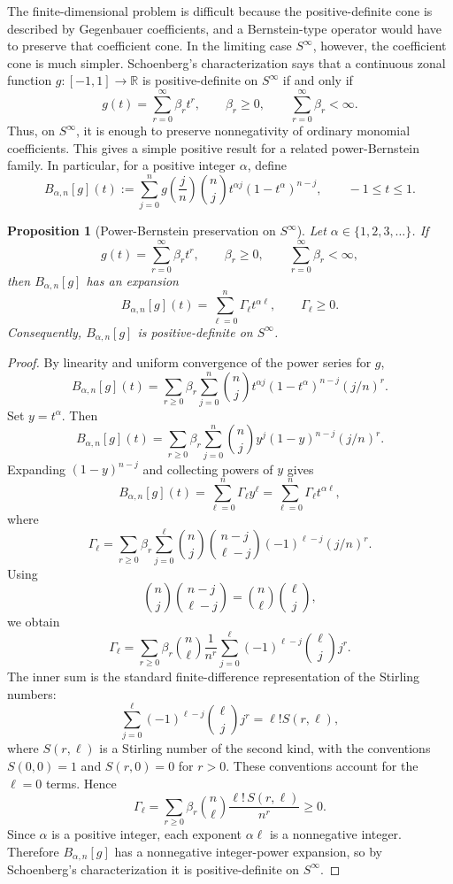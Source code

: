 \documentclass[10pt,a4paper]{amsart}
\newtheorem{proposition}[theorem]{Proposition}
\begin{document}
The finite-dimensional problem is difficult because the positive-definite cone is described by Gegenbauer coefficients, and a Bernstein-type operator would have to preserve that coefficient cone. In the limiting case $S^\infty$, however, the coefficient cone is much simpler. Schoenberg's characterization says that a continuous zonal function $g:[-1,1]\to\mathbb R$ is positive-definite on $S^\infty$ if and only if 
\[ 
g(t)=\sum_{r=0}^{\infty} \beta_r t^r, \qquad \beta_r\ge0, \qquad \sum_{r=0}^{\infty}\beta_r<\infty. 
\] 
Thus, on $S^\infty$, it is enough to preserve nonnegativity of ordinary monomial coefficients. This gives a simple positive result for a related power-Bernstein family. In particular, for a positive integer $\alpha$, define
\[
B_{\alpha,n}[g](t):= \sum_{j=0}^{n}
g \left(\frac{j}{n}\right)
\binom{n}{j}t^{\alpha j}(1-t^\alpha)^{n-j}, \qquad -1\le t\le1.
\]

\begin{proposition}[Power-Bernstein preservation on $S^\infty$]
\label{prop:power-bernstein-sinfty}
Let $\alpha \in \{1,2,3,\ldots\}$. If
\[
g(t) = \sum_{r=0}^{\infty}\beta_r t^r, 
\qquad \beta_r\ge0,
\qquad \sum_{r=0}^{\infty}\beta_r < \infty,
\]
then $B_{\alpha,n}[g]$ has an expansion
\[
B_{\alpha,n}[g](t) = \sum_{\ell=0}^{n} \Gamma_\ell t^{\alpha\ell},
\qquad \Gamma_\ell \ge 0.
\]
Consequently, $B_{\alpha,n}[g]$ is positive-definite on $S^\infty$.
\end{proposition}

\begin{proof}
By linearity and uniform convergence of the power series for $g$,
\[
B_{\alpha,n}[g](t)
=
\sum_{r\ge0} \beta_r \sum_{j=0}^{n}\binom{n}{j} t^{\alpha j}(1-t^\alpha)^{n-j}(j/n)^r.
\]
Set $y = t^\alpha$. Then
\[
B_{\alpha,n}[g](t)
=
\sum_{r \ge 0} \beta_r \sum_{j=0}^{n}\binom{n}{j} y^j(1-y)^{n-j}(j/n)^r.
\]
Expanding $(1-y)^{n-j}$ and collecting powers of $y$ gives
\[
B_{\alpha,n}[g](t) 
= \sum_{\ell=0}^{n}\Gamma_\ell y^\ell
= \sum_{\ell=0}^{n}\Gamma_\ell t^{\alpha\ell},
\]
where
\[
\Gamma_\ell
=
\sum_{r\ge 0} \beta_r \sum_{j=0}^{\ell} \binom{n}{j}\binom{n-j}{\ell-j} (-1)^{\ell-j}(j/n)^r.
\]
Using
\[
\binom{n}{j}\binom{n-j}{\ell-j}
=
\binom{n}{\ell}\binom{\ell}{j},
\]
we obtain
\[
\Gamma_\ell
=
\sum_{r\ge0}\beta_r\binom{n}{\ell}\frac{1}{n^r}
\sum_{j=0}^{\ell}(-1)^{\ell-j}\binom{\ell}{j}j^r.
\]
The inner sum is the standard finite-difference representation of the Stirling numbers:
\[
\sum_{j=0}^{\ell}(-1)^{\ell-j}\binom{\ell}{j}j^r = \ell! S(r,\ell),
\]
where $S(r,\ell)$ is a Stirling number of the second kind, with the conventions $S(0,0)=1$ and $S(r,0)=0$ for $r>0$. These conventions account for the $\ell=0$ terms. Hence
\[
\Gamma_\ell
=
\sum_{r\ge0}\beta_r\binom{n}{\ell}\frac{\ell!\,S(r,\ell)}{n^r}
\ge0.
\]
Since $\alpha$ is a positive integer, each exponent $\alpha\ell$ is a
nonnegative integer. Therefore $B_{\alpha,n}[g]$ has a nonnegative integer-power
expansion, so by Schoenberg's characterization it is positive-definite on
$S^\infty$.
\end{proof}
\end{document}
